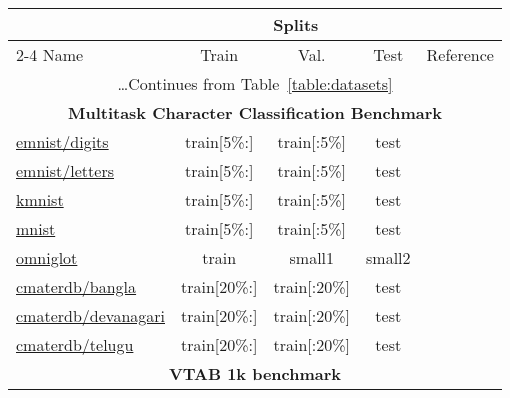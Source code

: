 \documentclass{article} \usepackage{iclr2023_conference,times}
\begin{document}
\begin{table*}[h]
\small
\caption{Datasets splits and reference (part 2 of 2).}
\label{table:datasets2}
\centering
\setlength\tabcolsep{3pt}
\begin{tabular}{lcccc}
    \toprule
& \multicolumn{3}{c}{Splits}                   \\
\cmidrule(r){2-4}
    Name & Train & Val. & Test  & Reference\\
    \midrule
    \midrule
\multicolumn{5}{c}{\dots Continues from Table~\ref{table:datasets} }\\
\midrule
\multicolumn{5}{c}{\textbf{Multitask Character Classification Benchmark}} \\

\href{https://www.tensorflow.org/datasets/catalog/emnist#emnistdigits}{emnist/digits}
& train[5\%:] & train[:5\%] & test
& \citep{Cohen2017EMNISTEM}
\\
\href{https://www.tensorflow.org/datasets/catalog/emnist#emnistletters}{emnist/letters}
&train[5\%:] & train[:5\%] & test
& \citep{Cohen2017EMNISTEM}
\\
\href{https://www.tensorflow.org/datasets/catalog/kmnist}{kmnist}
& train[5\%:] & train[:5\%] & test
& \citep{Clanuwat2018DeepLF}
\\
\href{https://www.tensorflow.org/datasets/catalog/mnist}{mnist}
& train[5\%:] & train[:5\%] & test
& \citep{LeCun1998GradientbasedLA}
\\
\href{https://www.tensorflow.org/datasets/catalog/omniglot}{omniglot}
& train & small1 & small2
& \citep{Lake2015HumanlevelCL}
\\
\href{https://www.tensorflow.org/datasets/catalog/cmaterdb#cmaterdbbangla_default_config}{cmaterdb/bangla}
& train[20\%:] & train[:20\%] & test
& \citep{Das2012AGA,Das2012ASF}
\\
\href{https://www.tensorflow.org/datasets/catalog/cmaterdb#cmaterdbdevanagari}{cmaterdb/devanagari}
& train[20\%:] & train[:20\%] & test
& \citep{Das2012AGA,Das2012ASF}
\\
\href{https://www.tensorflow.org/datasets/catalog/cmaterdb#cmaterdbtelugu}{cmaterdb/telugu}
& train[20\%:] & train[:20\%] & test
& \citep{Das2012AGA,Das2012ASF}
\\

\midrule

\multicolumn{5}{c}{\textbf{VTAB 1k benchmark}} \\


\end{tabular}
\end{table*}
\end{document}
